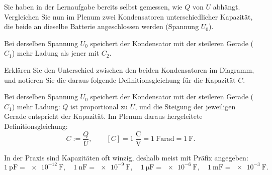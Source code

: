 \documentclass[addpoints,11pt,a4paper]{exam}
\newlength{\antwortraumlen}
\newcommand{\Antwortraum}[1]{%
  \pgfmathsetlength{\antwortraumlen}{#1*2.5cm}%
  \begin{answerbox}
    \rule{0pt}{\antwortraumlen}%
  \end{answerbox}%
}
\begin{document}
\begin{questions}
\begin{groupbox}
Sie haben in der Lernaufgabe bereits selbst gemessen, wie $Q$ von $U$
abhängt. Vergleichen Sie nun im Plenum zwei Kondensatoren
unterschiedlicher Kapazität, die beide an dieselbe Batterie angeschlossen
werden (Spannung $U_0$).

\begin{center}
\end{center}
{\scriptsize Bei derselben Spannung $U_0$ speichert der Kondensator mit
der steileren Gerade ($C_1$) mehr Ladung als jener mit $C_2$.}

\question[2] Erklären Sie den Unterschied zwischen den beiden
Kondensatoren im Diagramm, und notieren Sie die daraus folgende
Definitionsgleichung für die Kapazität $C$.
\Antwortraum{2}
\begin{solution}
Bei derselben Spannung $U_0$ speichert der Kondensator mit der steileren
Gerade ($C_1$) mehr Ladung: $Q$ ist proportional zu $U$, und die Steigung
der jeweiligen Gerade entspricht der Kapazität. Im Plenum daraus
hergeleitete Definitionsgleichung:
\[
  \boxed{C := \frac{Q}{U}}, \qquad [C] = 1\ \frac{\text{C}}{\text{V}} = 1\ \text{Farad} = \SI{1}{\farad}.
\]
\end{solution}

In der Praxis sind Kapazitäten oft winzig, deshalb meist mit Präfix
angegeben:
\[
  \SI{1}{\pico\farad} = \SI{e-12}{\farad}, \quad
  \SI{1}{\nano\farad} = \SI{e-9}{\farad}, \quad
  \SI{1}{\micro\farad} = \SI{e-6}{\farad}, \quad
  \SI{1}{\milli\farad} = \SI{e-3}{\farad}.
\]
\end{groupbox}
\end{questions}
\end{document}
